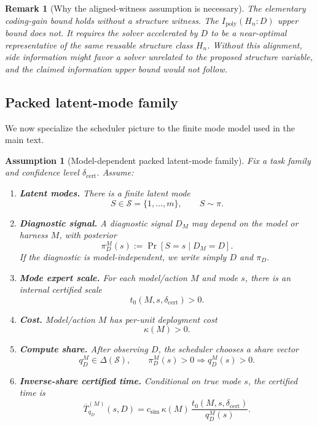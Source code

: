 \documentclass{article}
\newtheorem{assumption}{Assumption}
\newtheorem{remark}{Remark}
\newcommand{\cS}{\mathcal{S}}
\begin{document}
\begin{remark}[Why the aligned-witness assumption is necessary]
The elementary coding-gain bound holds without a structure witness.
The \(I_{\mathrm{poly}}(H_n:D)\) upper bound does not.
It requires the solver accelerated by \(D\) to be a near-optimal representative of the
same reusable structure class \(H_n\).
Without this alignment, side information might favor a solver unrelated to the proposed
structure variable, and the claimed information upper bound would not follow.
\end{remark}

\subsection{Packed latent-mode family}

We now specialize the scheduler picture to the finite mode model used in the main text.

\begin{assumption}[Model-dependent packed latent-mode family]
\label{ass:app-packed-model}
Fix a task family and confidence level \(\delta_{\mathrm{cert}}\).
Assume:
\begin{enumerate}[leftmargin=1.25em,itemsep=0.15em]
    \item \textbf{Latent modes.}
    There is a finite latent mode
    \[
        S\in\cS=\{1,\ldots,m\},
        \qquad
        S\sim\pi.
    \]
    \item \textbf{Diagnostic signal.}
    A diagnostic signal \(D_M\) may depend on the model or harness \(M\), with posterior
    \[
        \pi_D^M(s):=\Pr[S=s\mid D_M=D].
    \]
    If the diagnostic is model-independent, we write simply \(D\) and \(\pi_D\).
    \item \textbf{Mode expert scale.}
    For each model/action \(M\) and mode \(s\), there is an internal certified scale
    \[
        t_0(M,s,\delta_{\mathrm{cert}})>0.
    \]
    \item \textbf{Cost.}
    Model/action \(M\) has per-unit deployment cost
    \[
        \kappa(M)>0.
    \]
    \item \textbf{Compute share.}
    After observing \(D\), the scheduler chooses a share vector
    \[
        q_D^M\in\Delta(\cS),
        \qquad
        \pi_D^M(s)>0\Rightarrow q_D^M(s)>0.
    \]
    \item \textbf{Inverse-share certified time.}
    Conditional on true mode \(s\), the certified time is
    \[
        \overline T^{(M)}_{q_D}(s,D)
        =
        c_{\mathrm{sim}}\,
        \kappa(M)\,
        \frac{t_0(M,s,\delta_{\mathrm{cert}})}{q_D^M(s)}.
    \]
\end{enumerate}
\end{assumption}
\end{document}
